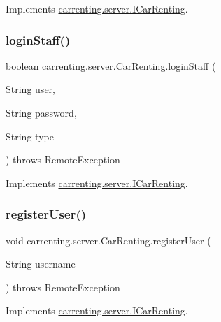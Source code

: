 Implements \mbox{\hyperlink{interfacecarrenting_1_1server_1_1_i_car_renting_a314ae8f7230cca5469932eb3034d5c49}{carrenting.\+server.\+I\+Car\+Renting}}.

\mbox{\label{classcarrenting_1_1server_1_1_car_renting_a99b2a341e48a7270ae5ee51d8ac4414c}} 
\subsubsection{\texorpdfstring{loginStaff()}{loginStaff()}}
{\footnotesize\ttfamily boolean carrenting.\+server.\+Car\+Renting.\+login\+Staff (\begin{DoxyParamCaption}\item[{String}]{user,  }\item[{String}]{password,  }\item[{String}]{type }\end{DoxyParamCaption}) throws Remote\+Exception}



Implements \mbox{\hyperlink{interfacecarrenting_1_1server_1_1_i_car_renting_affb9a568ddfe7cd2712f367c38e0e432}{carrenting.\+server.\+I\+Car\+Renting}}.

\mbox{\label{classcarrenting_1_1server_1_1_car_renting_ae378b81a5c614b66474e89c26c513cb7}} 
\subsubsection{\texorpdfstring{registerUser()}{registerUser()}}
{\footnotesize\ttfamily void carrenting.\+server.\+Car\+Renting.\+register\+User (\begin{DoxyParamCaption}\item[{String}]{username }\end{DoxyParamCaption}) throws Remote\+Exception}



Implements \mbox{\hyperlink{interfacecarrenting_1_1server_1_1_i_car_renting_a2cc1d35537a158a56fcc8315ab18af77}{carrenting.\+server.\+I\+Car\+Renting}}.

